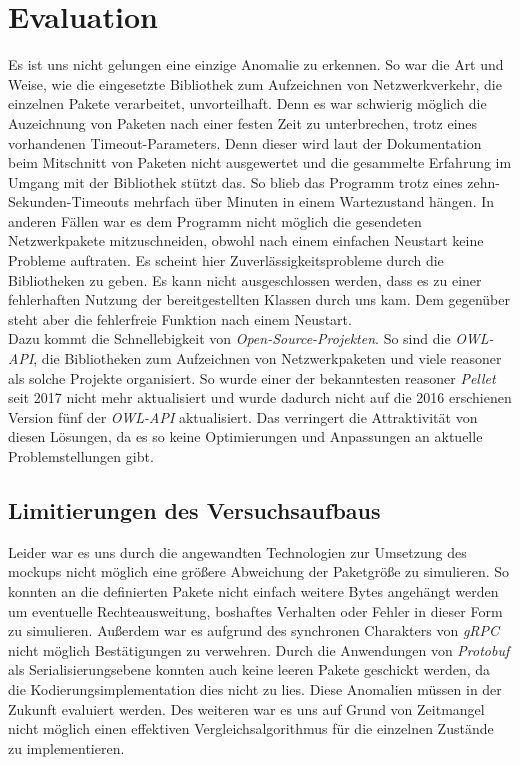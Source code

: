 \chapter{Evaluation}
Es ist uns nicht gelungen eine einzige Anomalie zu erkennen. So war die Art und Weise, wie die eingesetzte Bibliothek zum Aufzeichnen von Netzwerkverkehr, die einzelnen Pakete verarbeitet, unvorteilhaft. Denn es war schwierig möglich die Auzeichnung von Paketen nach einer festen Zeit zu unterbrechen, trotz eines vorhandenen Timeout-Parameters. Denn dieser wird laut der Dokumentation\cite{pcaploop} beim Mitschnitt von Paketen nicht ausgewertet und die gesammelte Erfahrung im Umgang mit der Bibliothek stützt das. So blieb das Programm trotz eines zehn-Sekunden-Timeouts mehrfach über Minuten in einem Wartezustand hängen. In anderen Fällen war es dem Programm nicht möglich die gesendeten Netzwerkpakete mitzuschneiden, obwohl nach einem einfachen Neustart keine Probleme auftraten. Es scheint hier Zuverlässigkeitsprobleme durch die Bibliotheken zu geben. Es kann nicht ausgeschlossen werden, dass es zu einer fehlerhaften Nutzung der bereitgestellten Klassen durch uns kam. Dem gegenüber steht aber die fehlerfreie Funktion nach einem Neustart.\\
Dazu kommt die Schnellebigkeit von \textit{Open-Source-Projekten}. So sind die \textit{OWL-API}, die Bibliotheken zum Aufzeichnen von Netzwerkpaketen und viele \Gls{reasoner} als solche Projekte organisiert. So wurde einer der bekanntesten \Gls{reasoner} \textit{Pellet}\cite{pellet} seit 2017 nicht mehr aktualisiert und wurde dadurch nicht auf die 2016 erschienen Version fünf der \textit{OWL-API} aktualisiert. Das verringert die Attraktivität von diesen Lösungen, da es so keine Optimierungen und Anpassungen an aktuelle Problemstellungen gibt.
\section{Limitierungen des Versuchsaufbaus}
Leider war es uns durch die angewandten Technologien zur Umsetzung des \Gls{mockup}s nicht möglich eine größere Abweichung der Paketgröße zu simulieren. So konnten an die definierten Pakete nicht einfach weitere Bytes angehängt werden um eventuelle Rechteausweitung, boshaftes Verhalten oder Fehler in dieser Form zu simulieren. Außerdem war es aufgrund des synchronen Charakters von \textit{gRPC}\cite{grpc} nicht möglich Bestätigungen zu verwehren. Durch die Anwendungen von \textit{Protobuf}\cite{protobuf} als Serialisierungsebene konnten auch keine leeren Pakete geschickt werden, da die Kodierungsimplementation dies nicht zu lies. Diese Anomalien müssen in der Zukunft evaluiert werden. Des weiteren war es uns auf Grund von Zeitmangel nicht möglich einen effektiven Vergleichsalgorithmus für die einzelnen Zustände zu implementieren.

